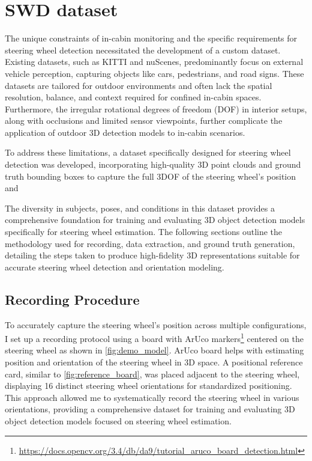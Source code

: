 \chapter{SWD dataset}

The unique constraints of in-cabin monitoring and the specific 
requirements for steering wheel detection necessitated the development 
of a custom dataset. Existing datasets, such as KITTI and nuScenes, 
predominantly focus on external vehicle perception, capturing objects 
like cars, pedestrians, and road signs. These datasets are tailored 
for outdoor environments and often lack the spatial resolution, 
balance, and context required for confined in-cabin spaces. 
Furthermore, the irregular rotational degrees of freedom (DOF) in 
interior setups, along with occlusions and limited sensor viewpoints, 
further complicate the application of outdoor 3D detection models to 
in-cabin scenarios.

To address these limitations, a dataset specifically designed for 
steering wheel detection was developed, incorporating high-quality 3D 
point clouds and ground truth bounding boxes to capture the full 3DOF 
of the steering wheel’s position and 

The diversity in subjects, poses, and conditions in this dataset 
provides a comprehensive foundation for training and evaluating 3D 
object detection models specifically for steering wheel estimation. 
The following sections outline the methodology used for recording, 
data extraction, and ground truth generation, detailing the steps 
taken to produce high-fidelity 3D representations suitable for 
accurate steering wheel detection and orientation modeling.


\section{Recording Procedure}
To accurately capture the steering wheel's position across multiple 
configurations, I set up a recording protocol using a board with 
ArUco markers\footnote{\url{https://docs.opencv.org/3.4/db/da9/tutorial_aruco_board_detection.html}} 
centered on the steering wheel as shown in \cref{fig:demo_model}. 
ArUco board helps with estimating position and orientation of 
the steering wheel in 3D space.  A positional reference card, 
similar to \cref{fig:reference_board}, was placed adjacent to the steering wheel, displaying 
16 distinct steering wheel orientations for standardized positioning. 
This approach allowed me to systematically record the steering wheel 
in various orientations, providing a comprehensive dataset for training 
and evaluating 3D object detection models focused on steering wheel 
estimation.

